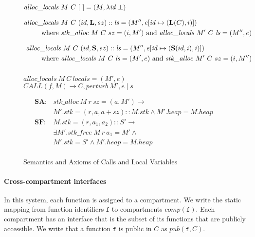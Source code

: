 \begin{figure}
  \scriptsize
  \[\begin{split}
  \mathit{alloc\_locals} ~ & M ~ C ~ [~] = (M, \lambda \mathit{id} . \bot) \\[0.75em]
  \mathit{alloc\_locals} ~ & M ~ C ~ (id,\mathbf{L},sz)::\mathit{ls} =
  (M'', e[\mathit{id} \mapsto (\mathbf{L}(C),i)]) \\
  \textnormal{where } & \mathit{stk\_alloc} ~ M ~ C ~ sz = (i, M')
  \textnormal{ and } \mathit{alloc\_locals} ~ M' ~ C ~ \mathit{ls} = (M'', e) \\[0.75em]
  \mathit{alloc\_locals} & ~ M ~ C ~ (id,\mathbf{S},sz)::\mathit{ls} =
  (M'', e[\mathit{id} \mapsto (\mathbf{S}(id,i),i)]) \\
  \textnormal{where } & \mathit{alloc\_locals} ~ M ~ C ~ \mathit{ls} = (M', e)
  \textnormal{ and } \mathit{stk\_alloc} ~ M' ~ C ~ sz = (i, M'') \\[0.75em]
  \end{split}\]
      
              {\(\mathit{alloc\_locals} ~ M ~ C ~ \mathit{locals} = (M',e)\)}
              {\(\mathit{CALL}(f,M) \longrightarrow
                C,\mathit{perturb} ~ M',e \mid s\)}

  \[\begin{aligned}
  \mathbf{SA} : & \mathit{stk\_alloc} ~ M ~ r ~ sz = (a, M') \rightarrow & \\
  & M'.stk = (r,a,a+sz)::M.stk \land M'.heap = M.heap & \\[0.75em]
  \mathbf{SF} : & M.stk = (r,a_1,a_2)::S' \rightarrow & \\
  & \exists M' . \mathit{stk\_free} ~ M ~ r ~ a_1 = M' \land & \\
  & M'.stk = S' \land M'.heap = M.heap & \\[0.75em]
  \end{aligned}\]

  \caption{Semantics and Axioms of Calls and Local Variables}
  \label{ch5:fig:callret}

\end{figure}

\paragraph{Cross-compartment interfaces}
\label{ch5:sec:interfaces}

In this system, each function is assigned to a compartment. We write the static mapping
from function identifiers \(\mathtt{f}\) to compartments \(\mathit{comp}(\mathtt{f})\).
Each compartment has an interface that is the subset of its functions that are publicly
accessible. We write that a function \(\mathtt{f}\) is public in \(C\) as
\(\mathit{pub}(\mathtt{f},C)\).

